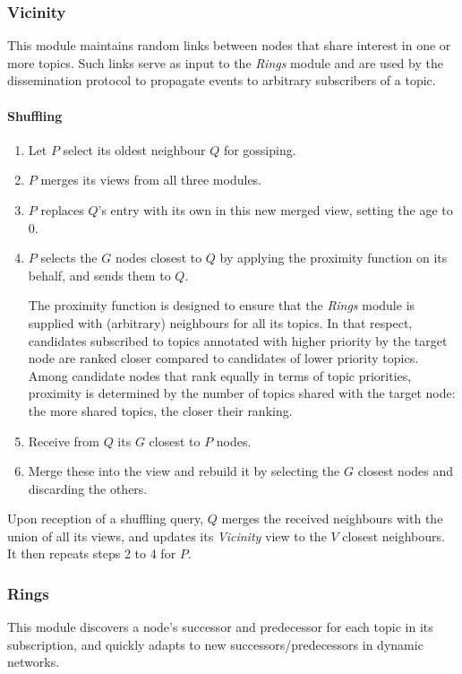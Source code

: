 \documentclass[10pt,a4paper,onecolumn]{article}
\begin{document}
\subsubsection{Vicinity}
This module maintains random links between nodes that share interest in one or more topics. Such links serve as input to the \textit{Rings} module and are used by the dissemination protocol to propagate events to arbitrary subscribers of a topic.

\paragraph*{Shuffling}
\begin{enumerate}
\item Let $P$ select its oldest neighbour $Q$ for gossiping.
\item $P$ merges its views from all three modules.
\item $P$ replaces $Q$'s entry with its own in this new merged view, setting the age to 0.
\item $P$ selects the $G$ nodes closest to $Q$ by applying the proximity function on its behalf, and sends them to $Q$. 

The proximity function is designed to ensure that the \textit{Rings} module is supplied with (arbitrary) neighbours for all its topics. In that respect, candidates subscribed to topics annotated with higher priority by the target node are ranked closer compared to candidates of lower priority topics. Among candidate nodes that rank equally in terms of topic priorities, proximity is determined by the number of topics shared with the target node: the more shared topics, the closer their ranking.
\item Receive from $Q$ its $G$ closest to $P$ nodes.
\item Merge these into the view and rebuild it by selecting the $G$ closest nodes and discarding the others.
\end{enumerate}

Upon reception of a shuffling query, $Q$ merges the received neighbours with the union of all its views, and updates its \textit{Vicinity} view to the $V$ closest neighbours. It then repeats steps 2 to 4 for $P$. 

\subsubsection{Rings}
This module discovers a node's successor and predecessor for each topic in its subscription, and quickly adapts to new successors/predecessors in dynamic networks.
\end{document}
